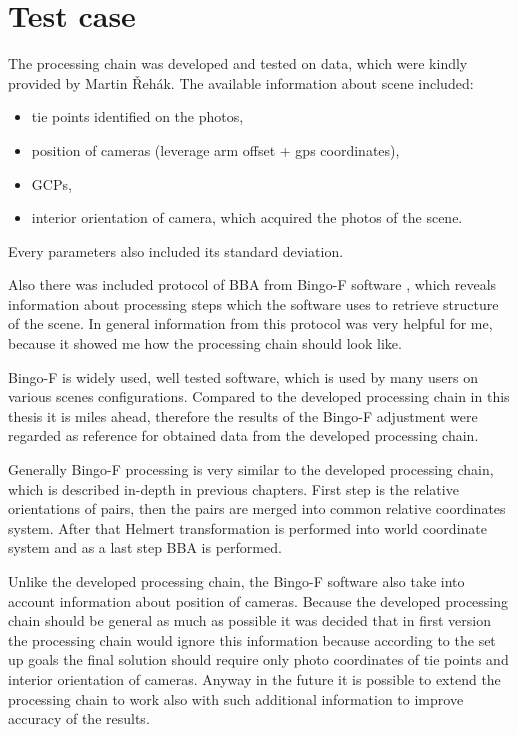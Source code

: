 \documentclass[a4paper,12pt]{article}
\begin{document}

\section{Test case}

The processing chain was developed and tested on data, which were kindly provided by Martin Řehák. The available 
information about scene included:

\begin{itemize}
\item tie points identified on the photos,
\item position of cameras (leverage arm offset + gps coordinates),
\item GCPs,
\item interior orientation of camera, which acquired the photos of the scene.
\end{itemize}

Every parameters also included its standard deviation. 


Also there was included protocol of BBA from Bingo-F software \cite{bingo2013gip}, which reveals 
information about processing steps which the software uses to retrieve structure of the scene.
In general information from this protocol was very helpful for me, because 
 it showed me how the processing chain should look like.

Bingo-F is widely used, well tested software, which is used by many users on various scenes configurations.  
Compared to the developed processing chain in this thesis it is miles ahead, therefore the results of the Bingo-F adjustment were 
regarded as reference for obtained data from the developed processing chain.

Generally Bingo-F processing is very similar to the developed  processing chain, which is  
described in-depth in previous chapters. First step is the relative orientations of pairs, then the pairs are merged into common relative 
coordinates system. After that Helmert transformation is performed into world coordinate system and as a last step BBA is performed.

Unlike the developed processing chain,  the Bingo-F software also take into account information about position of cameras. 
Because the developed processing chain should be general as much as possible it was decided that in first version  the processing chain would ignore this 
information because according to the set up goals the final solution should require only photo coordinates of tie points and interior 
orientation of cameras. Anyway in the future it is possible to extend the processing chain to work also with such additional information to improve accuracy 
of the results. 
\end{document}
